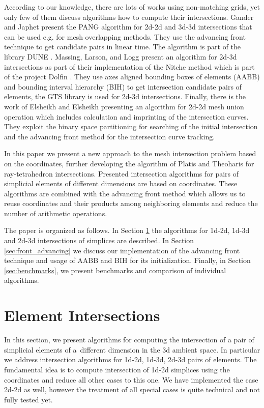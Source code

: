 According to our knowledge, there are lots of works using non-matching grids, yet only few of them discuss algorithms how to compute their intersections. 
Gander and Japhet \cite{gander_algorithm_2013} present the PANG algorithm for 2d-2d and 3d-3d intersections that can be used e.g. for mesh overlapping methods.
They use the advancing front technique to get candidate pairs in linear time. The algorithm is part of the library DUNE \cite{bastian_towards_2005}.
Massing, Larson, and Logg \cite{massing_efficient_2013} present an algorithm for 2d-3d intersections as part of their implementation of the Nitche method 
which is part of the project Dolfin \cite{dolphin_2012}. They use axes aligned bounding boxes of elements (AABB) and bounding interval hierarchy (BIH) 
to get intersection candidate pairs of elements, the GTS library \cite{gtslib} is used for 2d-3d intersections. 
Finally, there is the work of Elsheikh and Elsheikh \cite{elsheikh_reliable_2012} presenting an algorithm for 2d-2d mesh union operation which includes 
calculation and imprinting of the intersection curves. They exploit the binary space partitioning for searching of the initial intersection and 
the advancing front method for the intersection curve tracking. 

In this paper we present a new approach to the mesh intersection problem based on the \plucker coordinates,
further developing the algorithm of Platis and Theoharis \cite{platis_fast_2003} for ray-tetrahedron intersections. 
Presented intersection algorithms for pairs of simplicial elements of different dimensions are based on \plucker coordinates.
These algorithms are combined with the advancing front method which allows us to reuse \plucker coordinates and their products among neighboring
elements and reduce the number of arithmetic operations. 

The paper is organized as follows. In Section \ref{sec:element intersecitons} the algorithms for
1d-2d, 1d-3d and 2d-3d intersections of simplices are described. In Section \ref{sec:front_advancing} we discuss our implementation of the advancing front 
technique and usage of AABB and BIH for its initialization. Finally, in Section \ref{sec:benchmarks}, we present benchmarks and comparison of individual algorithms.


\section{Element Intersections}
\label{sec:element intersecitons}
In this section, we present algorithms for computing the intersection of a pair of simplicial elements of a~different dimension in the 3d ambient space. 
In particular we address intersection algorithms for 1d-2d, 1d-3d, 2d-3d pairs of elements.  The fundamental idea is to compute intersection of 1d-2d 
simplices using the \plucker coordinates and reduce all other cases to this one. We have implemented the case 2d-2d as well, however the treatment 
of all special cases is quite technical and not fully tested yet.

